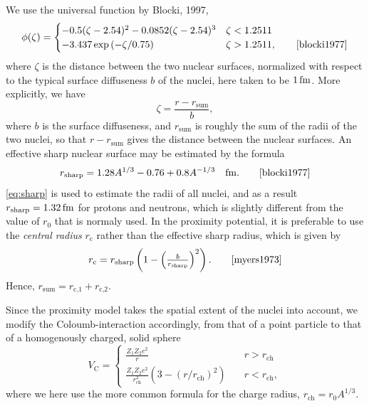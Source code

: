 We use the universal function by Blocki, 1997,
\begin{equation}
\phi(\zeta)= \begin{cases}-0.5(\zeta-2.54)^2-0.0852(\zeta-2.54)^3 & \zeta < 1.2511 \\
-3.437\exp{(-\zeta/0.75)} & \zeta > 1.2511,\qquad\cite{blocki1977}
\end{cases}\label{eq:prox}
\end{equation}
where $\zeta$ is the distance between the two nuclear surfaces, normalized with respect to the typical surface diffuseness $b$ of the nuclei, here taken to be $\unit[1]{fm}$\cite{blocki1977}. More explicitly, we have
\begin{equation}
\zeta = \frac{r - r_\text{sum}}{b},
\end{equation}
where $b$ is the surface diffuseness, and $r_\text{sum}$ is roughly the sum of the radii of the two nuclei, so that $r-r_\text{sum}$ gives the distance between the nuclear surfaces\cite{blocki1977}. An effective sharp nuclear surface may be estimated by the formula
\begin{equation}
r_\text{sharp} = 1.28 A^{1/3} - 0.76 + 0.8 A^{-1/3}\quad\unit{fm}.\qquad\cite{blocki1977}\label{eq:sharp}
\end{equation}
\autoref{eq:sharp} is used to estimate the radii of all nuclei, and as a result $r_\text{sharp}=\unit[1.32]{fm}$ for protons and neutrons, which is slightly different from the value of $r_0$ that is normaly used.
In the proximity potential, it is preferable to use the \emph{central radius} $r_\text{c}$ rather than the effective sharp radius\cite{blocki1977}, which is given by 
\begin{equation}
r_\text{c} =r_\text{sharp} \left(1-\left(\tfrac{b}{r_\text{sharp}}\right)^2\right).\qquad\cite{myers1973}
\end{equation}
Hence, $r_\text{sum} = r_\text{c,1}+r_\text{c,2}$. 


Since the proximity model takes the spatial extent of the nuclei into account, we modify the Coloumb-interaction accordingly, from that of a point particle to that of a homogenously charged, solid sphere
\begin{equation}
V_\text{C} = \begin{cases}\frac{Z_1 Z_2 e^2}{r} &\quad r>r_\text{ch} \\ \frac{Z_1 Z_2 e^2}{r_\text{ch}^2}(3-(r/r_\text{ch})^2) &\quad r<r_\text{ch}, \end{cases}
\end{equation}
where we here use the more common formula for the charge radius, $r_\text{ch} = r_0 A^{1/3}$.

